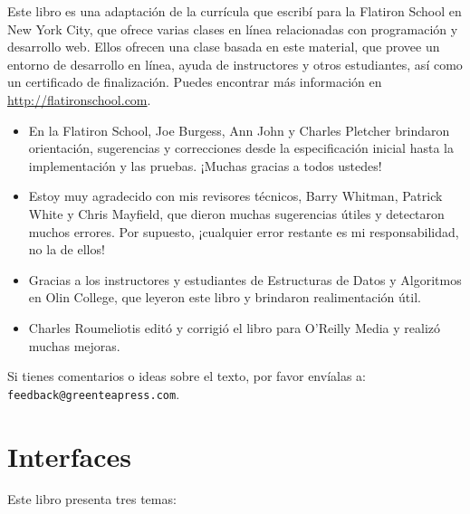 \documentclass[12pt]{book}
\theoremstyle{exercise}
\begin{document}
Este libro es una adaptación de la currícula que escribí para la
Flatiron School en New York City, que ofrece varias clases en línea
relacionadas con programación y desarrollo web. Ellos ofrecen una
clase basada en este material, que provee un entorno de desarrollo
en línea, ayuda de instructores y otros estudiantes, así como un
certificado de finalización. Puedes encontrar más información en
\url{http://flatironschool.com}.


\begin{itemize}

\item En la Flatiron School, Joe Burgess, Ann John y Charles
  Pletcher brindaron orientación, sugerencias y correcciones desde la
  especificación inicial hasta la implementación y las pruebas. ¡Muchas
  gracias a todos ustedes!

\item Estoy muy agradecido con mis revisores técnicos, Barry Whitman,
  Patrick White y Chris Mayfield, que dieron muchas sugerencias útiles
  y detectaron muchos errores. Por supuesto, ¡cualquier error restante
  es mi responsabilidad, no la de ellos!

\item Gracias a los instructores y estudiantes de Estructuras de Datos y
  Algoritmos en Olin College, que leyeron este libro y brindaron realimentación
  útil.

\item Charles Roumeliotis editó y corrigió el libro para O'Reilly Media
y realizó muchas mejoras.


\end{itemize}



Si tienes comentarios o ideas sobre el texto, por favor envíalas a:\linebreak
{\tt feedback@greenteapress.com}.

\mainmatter

\chapter{Interfaces}
\label{cs-lists-programming-to-an-interface-readme}

Este libro presenta tres temas:
\end{document}
